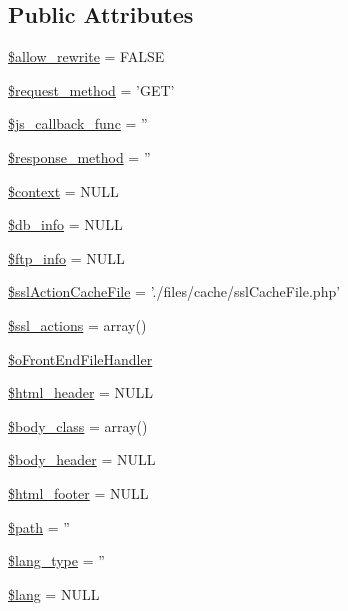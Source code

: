 \subsection*{Public Attributes}
\begin{DoxyCompactItemize}
\item 
\hyperlink{classContext_a24355a0c151bd3285c45254f773af275}{\$allow\-\_\-rewrite} = F\-A\-L\-S\-E
\item 
\hyperlink{classContext_a1e80f487f65708456eb17be0024aee50}{\$request\-\_\-method} = 'G\-E\-T'
\item 
\hyperlink{classContext_afddd5e6374a20b88466dfd1cb6f32d62}{\$js\-\_\-callback\-\_\-func} = ''
\item 
\hyperlink{classContext_a383836fb81ee24d673c7145e4d2eb030}{\$response\-\_\-method} = ''
\item 
\hyperlink{classContext_a39e9103dacbca5e5fa49d6e93f0ccec3}{\$context} = N\-U\-L\-L
\item 
\hyperlink{classContext_a6f4d307bdcb4bfd83fda27bc265977eb}{\$db\-\_\-info} = N\-U\-L\-L
\item 
\hyperlink{classContext_a8b9cb334c451f773d75db73b01f86ccc}{\$ftp\-\_\-info} = N\-U\-L\-L
\item 
\hyperlink{classContext_a5554b6376a0703ebfbdf2bf79800bfee}{\$ssl\-Action\-Cache\-File} = './files/cache/ssl\-Cache\-File.\-php'
\item 
\hyperlink{classContext_a9f8d33aa42d3851da1134d3ba2fbf009}{\$ssl\-\_\-actions} = array()
\item 
\hyperlink{classContext_a55e855769152e53af5e2ecb9b889c7f6}{\$o\-Front\-End\-File\-Handler}
\item 
\hyperlink{classContext_ab0146079ffcc658bbe5bbf4ba7b8e934}{\$html\-\_\-header} = N\-U\-L\-L
\item 
\hyperlink{classContext_af0bb833a3157d6d2153d7858cb60e435}{\$body\-\_\-class} = array()
\item 
\hyperlink{classContext_aa2c90f49a1f6389eadea8962d0fbf5b3}{\$body\-\_\-header} = N\-U\-L\-L
\item 
\hyperlink{classContext_ad55e79b648659c59512e02a6c0d349ff}{\$html\-\_\-footer} = N\-U\-L\-L
\item 
\hyperlink{classContext_a0752e74e1ec01a4fd63c044a1d3bd28b}{\$path} = ''
\item 
\hyperlink{classContext_a170ac1b95c16b53af329395df9376e9f}{\$lang\-\_\-type} = ''
\item 
\hyperlink{classContext_a0771720dad655d0c53f6f31066c67a40}{\$lang} = N\-U\-L\-L
\item 

\end{DoxyCompactItemize}
